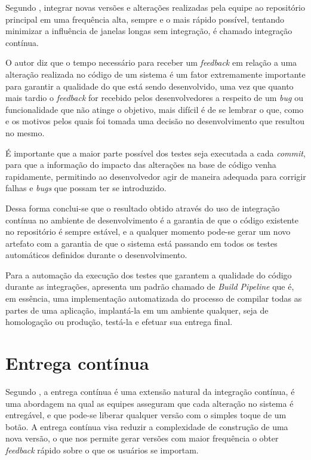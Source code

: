 \documentclass[
	12pt,				%
	openright,			%
	oneside,			%
	a4paper,			%
	english,			%
	french,				%
	spanish,			%
	brazil,				%
	]{abntex2}
\begin{document}
Segundo , integrar novas versões e alterações realizadas pela equipe ao repositório principal em uma frequência alta, sempre e o mais rápido possível, tentando minimizar a influência de janelas longas sem integração, é chamado integração contínua. 

O autor diz que o tempo necessário para receber um \textit{feedback} em relação a uma alteração realizada no código de um sistema é um fator extremamente importante para garantir a qualidade do que está sendo desenvolvido, uma vez que quanto mais tardio o \textit{feedback} for recebido pelos desenvolvedores a respeito de um \textit{bug} ou funcionalidade que não atinge o objetivo, mais difícil é de se lembrar o que, como e os motivos pelos quais foi tomada uma decisão no desenvolvimento que resultou no mesmo.

\begin{citacao}
	É importante que a maior parte possível dos testes seja executada a cada \textit{commit}, para que a informação do impacto das alterações na base de código venha rapidamente, permitindo ao desenvolvedor agir de maneira adequada para corrigir falhas e \textit{bugs} que possam ter se introduzido.
	\cite{Caelum:ArquiteturaJava}
\end{citacao}

Dessa forma conclui-se que o resultado obtido através do uso de integração contínua no ambiente de desenvolvimento é a garantia de que o código existente no repositório é sempre estável, e a qualquer momento pode-se gerar um novo artefato com a garantia de que o sistema está passando em todos os testes automáticos definidos durante o desenvolvimento.

Para a automação da execução dos testes que garantem a qualidade do código durante as integrações,  apresenta um padrão chamado de \textit{Build Pipeline} que é, em essência, uma implementação automatizada do processo de compilar todas as partes de uma aplicação, implantá-la em um ambiente qualquer, seja de homologação ou produção, testá-la e efetuar sua entrega final.

\section{Entrega contínua}

Segundo , a entrega contínua é uma extensão natural da integração contínua, é uma abordagem na qual as equipes asseguram que cada alteração no sistema é entregável, e que pode-se liberar qualquer versão com o simples toque de um botão. A entrega contínua visa reduzir a complexidade de construção de uma nova versão, o que nos permite gerar versões com maior frequência o obter \textit{feedback} rápido sobre o que os usuários se importam.
\end{document}
